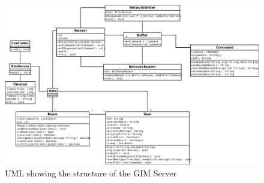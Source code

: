 \newpage
\begin{figure}
    \begin{center}
        \includegraphics[scale=0.5, angle=-90]{chapter2/diagrams/server_uml.png}
        \caption{UML showing the structure of the GIM Server}
        \label{highLevelDia}
    \end{center}
\end{figure}

